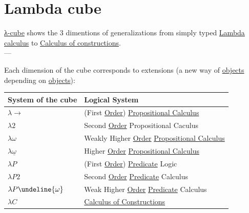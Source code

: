 \documentclass[a4paper,14pt,oneside]{book}
\begin{document}
\section{\label{org48a77e1}Lambda cube}
\label{sec:orgd7d4145}
\hyperref[org8045348]{λ-cube} shows the 3 dimentions of generalizations from simply typed \hyperref[orgddd0b5e]{Lambda calculus} to \hyperref[orgf9c4f91]{Calculus of constructions}.\\

---\\


Each dimension of the cube corresponds to extensions (a new way of \hyperref[orgfc35d9f]{objects} depending on \hyperref[orgfc35d9f]{objects}):\\

\begin{center}
\begin{tabular}{ll}
System of the cube & Logical System\\
\hline
\(\lambda\to\) & (First \hyperref[org4faf863]{Order}) \hyperref[org0cfedaa]{Propositional Calculus}\\
\(\lambda2\) & Second \hyperref[org4faf863]{Order} Propositional Caculus\\
\(\lambda\omega\) & Weakly Higher \hyperref[org4faf863]{Order} \hyperref[org0cfedaa]{Propositional Calculus}\\
\(\lambda \underline{\omega}\) & Higher \hyperref[org4faf863]{Order} \hyperref[org0cfedaa]{Propositional Calculus}\\
\(\lambda P\) & (First \hyperref[org4faf863]{Order}) \hyperref[org5e7cfac]{Predicate} Logic\\
\(\lambda P 2\) & Second \hyperref[org4faf863]{Order} \hyperref[org5e7cfac]{Predicate} Calculus\\
\(\lambda P \undeline{\omega}\) & Weak Higher \hyperref[org4faf863]{Order} \hyperref[org5e7cfac]{Predicate} Calculus\\
\(\lambda C\) & \hyperref[orgf9c4f91]{Calculus of Constructions}\\
\end{tabular}
\end{center}
\end{document}
